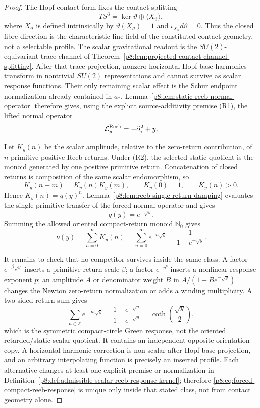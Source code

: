 \documentclass[12pt,a4paper]{article}
\begin{document}
\begin{proof}
The Hopf contact form fixes the contact splitting
\[
    TS^3=\ker\vartheta\oplus\langle X_\vartheta\rangle,
\]
where \(X_\vartheta\) is defined intrinsically by \(\vartheta(X_\vartheta)=1\) and \(\iota_{X_\vartheta}d\vartheta=0\).  Thus the closed fibre direction is the characteristic line field of the constituted contact geometry, not a selectable profile.  The scalar gravitational readout is the \(SU(2)\)-equivariant trace channel of Theorem~\ref{p8:lem:projected-contact-channel-splitting}.  After that trace projection, nonzero horizontal Hopf-base harmonics transform in nontrivial \(SU(2)\) representations and cannot survive as scalar response functions.  Their only remaining scalar effect is the Schur endpoint normalization already contained in \(a_*\).  Lemma~\ref{p8:lem:static-reeb-normal-operator} therefore gives, using the explicit source-additivity premise (R1), the lifted normal operator
\[
    \mathcal L_y^{\rm Reeb}=-\partial_\tau^2+y .
\]

Let \(K_y(n)\) be the scalar amplitude, relative to the zero-return contribution, of \(n\) primitive positive Reeb returns.  Under (R2), the selected static quotient is the monoid generated by one positive primitive return.  Concatenation of closed returns is composition of the same scalar endomorphism, so
\[
    K_y(n+m)=K_y(n)K_y(m),
    \qquad
    K_y(0)=1,
    \qquad
    K_y(n)>0 .
\]
Hence \(K_y(n)=q(y)^n\).  Lemma~\ref{p8:lem:reeb-single-return-damping} evaluates the single primitive transfer of the forced normal operator and gives
\[
    q(y)=e^{-\sqrt y}.
\]
Summing the allowed oriented compact-return monoid \(\mathbb N_0\) gives
\[
    \nu(y)=\sum_{n=0}^{\infty}K_y(n)
    =\sum_{n=0}^{\infty}e^{-n\sqrt y}
    =\frac{1}{1-e^{-\sqrt y}}.
\]

It remains to check that no competitor survives inside the same class.  A factor \(e^{-\beta\sqrt y}\) inserts a primitive-return scale \(\beta\); a factor \(e^{-y^p}\) inserts a nonlinear response exponent \(p\); an amplitude \(A\) or denominator weight \(B\) in \(A/(1-Be^{-\sqrt y})\) changes the Newton zero-return normalization or adds a winding multiplicity.  A two-sided return sum gives
\[
    \sum_{n\in\mathbb Z}e^{-|n|\sqrt y}
    =
    \frac{1+e^{-\sqrt y}}{1-e^{-\sqrt y}}
    =
    \coth\!\left(\frac{\sqrt y}{2}\right),
\]
which is the symmetric compact-circle Green response, not the oriented retarded/static scalar quotient.  It contains an independent opposite-orientation copy.  A horizontal-harmonic correction is non-scalar after Hopf-base projection, and an arbitrary interpolating function is precisely an inserted profile.  Each alternative changes at least one explicit premise or normalization in Definition~\ref{p8:def:admissible-scalar-reeb-response-kernel}; therefore \eqref{p8:eq:forced-compact-reeb-response} is unique only inside that stated class, not from contact geometry alone.
\end{proof}
\end{document}
